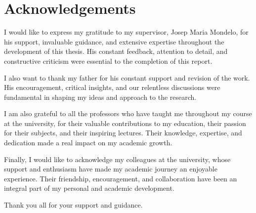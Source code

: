 \documentclass[../main.tex]{subfiles}
\begin{document}
\section*{Acknowledgements}
I would like to express my gratitude to my supervisor, Josep Maria Mondelo, for his support, invaluable guidance, and extensive expertise throughout the development of this thesis. His constant feedback, attention to detail, and constructive criticism were essential to the completion of this report.

I also want to thank my father for his constant support and revision of the work. His encouragement, critical insights, and our relentless discussions were fundamental in shaping my ideas and approach to the research.

I am also grateful to all the professors who have taught me throughout my course at the university, for their valuable contributions to my education, their passion for their subjects, and their inspiring lectures. Their knowledge, expertise, and dedication made a real impact on my academic growth.

Finally, I would like to acknowledge my colleagues at the university, whose support and enthusiasm have made my academic journey an enjoyable experience. Their friendship, encouragement, and collaboration have been an integral part of my personal and academic development.

Thank you all for your support and guidance.
\end{document}
